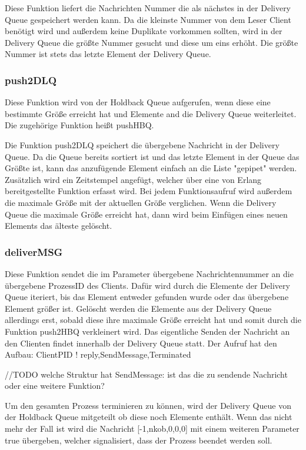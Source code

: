 Diese Funktion liefert die Nachrichten Nummer die als nächstes in der Delivery Queue gespeichert werden kann. Da die kleinste Nummer von dem Leser Client benötigt wird und außerdem keine Duplikate vorkommen sollten, wird in der Delivery Queue die größte Nummer gesucht und diese um eins erhöht. Die größte Nummer ist stets das letzte Element der Delivery Queue. 

\subsubsection{push2DLQ}

Diese Funktion wird von der Holdback Queue aufgerufen, wenn diese eine bestimmte Größe erreicht hat und Elemente and die Delivery Queue weiterleitet. Die zugehörige Funktion heißt pushHBQ.

Die Funktion push2DLQ speichert die übergebene Nachricht in der Delivery Queue. Da die Queue bereits sortiert ist und das letzte Element in der Queue das Größte ist, kann das anzufügende Element einfach an die Liste "gepipet" werden. Zusätzlich wird ein Zeitstempel angefügt, welcher über eine von Erlang bereitgestellte Funktion erfasst wird. 
Bei jedem Funktionsaufruf wird außerdem die maximale Größe mit der aktuellen Größe verglichen. Wenn die Delivery Queue die maximale Größe erreicht hat, dann wird beim Einfügen eines neuen Elements das älteste gelöscht. 

\subsubsection{deliverMSG}

Diese Funktion sendet die im Parameter übergebene Nachrichtennummer an die übergebene ProzessID des Clients. Dafür wird durch die Elemente der Delivery Queue iteriert, bis das Element entweder gefunden wurde oder das übergebene Element größer ist. 
Gelöscht werden die Elemente aus der Delivery Queue allerdings erst, sobald diese ihre maximale Größe erreicht hat und somit durch die Funktion push2HBQ verkleinert wird. 
Das eigentliche Senden der Nachricht an den Clienten findet innerhalb der Delivery Queue statt. 
Der Aufruf hat den Aufbau:
ClientPID ! {reply,SendMessage,Terminated}

//TODO welche Struktur hat SendMessage: ist das die zu sendende Nachricht oder eine weitere Funktion?

Um den gesamten Prozess terminieren zu können, wird der Delivery Queue von der Holdback Queue mitgeteilt ob diese noch Elemente enthält. Wenn das nicht mehr der Fall ist wird die Nachricht [-1,nkob,0,0,0] mit einem weiteren Parameter true übergeben, welcher signalisiert, dass der Prozess beendet werden soll. 

